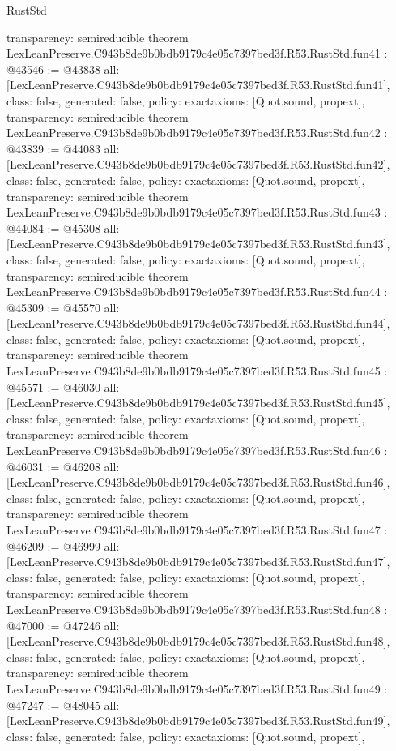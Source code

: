 \begin{lexlean}{RustStd}
\begin{coremodule}
{  transparency: semireducible
}
theorem LexLeanPreserve.C943b8de9b0bdb9179c4e05c7397bed3f.R53.RustStd.fun41 : @43546 := @43838 {
  all: [LexLeanPreserve.C943b8de9b0bdb9179c4e05c7397bed3f.R53.RustStd.fun41],
  class: false,
  generated: false,
  policy: exact{axioms: [Quot.sound, propext]},
  transparency: semireducible
}
theorem LexLeanPreserve.C943b8de9b0bdb9179c4e05c7397bed3f.R53.RustStd.fun42 : @43839 := @44083 {
  all: [LexLeanPreserve.C943b8de9b0bdb9179c4e05c7397bed3f.R53.RustStd.fun42],
  class: false,
  generated: false,
  policy: exact{axioms: [Quot.sound, propext]},
  transparency: semireducible
}
theorem LexLeanPreserve.C943b8de9b0bdb9179c4e05c7397bed3f.R53.RustStd.fun43 : @44084 := @45308 {
  all: [LexLeanPreserve.C943b8de9b0bdb9179c4e05c7397bed3f.R53.RustStd.fun43],
  class: false,
  generated: false,
  policy: exact{axioms: [Quot.sound, propext]},
  transparency: semireducible
}
theorem LexLeanPreserve.C943b8de9b0bdb9179c4e05c7397bed3f.R53.RustStd.fun44 : @45309 := @45570 {
  all: [LexLeanPreserve.C943b8de9b0bdb9179c4e05c7397bed3f.R53.RustStd.fun44],
  class: false,
  generated: false,
  policy: exact{axioms: [Quot.sound, propext]},
  transparency: semireducible
}
theorem LexLeanPreserve.C943b8de9b0bdb9179c4e05c7397bed3f.R53.RustStd.fun45 : @45571 := @46030 {
  all: [LexLeanPreserve.C943b8de9b0bdb9179c4e05c7397bed3f.R53.RustStd.fun45],
  class: false,
  generated: false,
  policy: exact{axioms: [Quot.sound, propext]},
  transparency: semireducible
}
theorem LexLeanPreserve.C943b8de9b0bdb9179c4e05c7397bed3f.R53.RustStd.fun46 : @46031 := @46208 {
  all: [LexLeanPreserve.C943b8de9b0bdb9179c4e05c7397bed3f.R53.RustStd.fun46],
  class: false,
  generated: false,
  policy: exact{axioms: [Quot.sound, propext]},
  transparency: semireducible
}
theorem LexLeanPreserve.C943b8de9b0bdb9179c4e05c7397bed3f.R53.RustStd.fun47 : @46209 := @46999 {
  all: [LexLeanPreserve.C943b8de9b0bdb9179c4e05c7397bed3f.R53.RustStd.fun47],
  class: false,
  generated: false,
  policy: exact{axioms: [Quot.sound, propext]},
  transparency: semireducible
}
theorem LexLeanPreserve.C943b8de9b0bdb9179c4e05c7397bed3f.R53.RustStd.fun48 : @47000 := @47246 {
  all: [LexLeanPreserve.C943b8de9b0bdb9179c4e05c7397bed3f.R53.RustStd.fun48],
  class: false,
  generated: false,
  policy: exact{axioms: [Quot.sound, propext]},
  transparency: semireducible
}
theorem LexLeanPreserve.C943b8de9b0bdb9179c4e05c7397bed3f.R53.RustStd.fun49 : @47247 := @48045 {
  all: [LexLeanPreserve.C943b8de9b0bdb9179c4e05c7397bed3f.R53.RustStd.fun49],
  class: false,
  generated: false,
  policy: exact{axioms: [Quot.sound, propext]},
}
\end{coremodule}
\end{lexlean}
